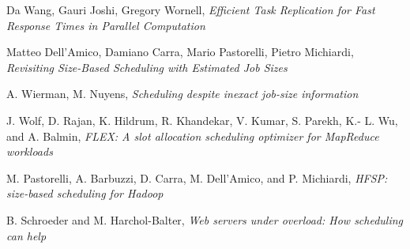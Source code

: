 \documentclass[10pt, conference, compsocconf]{IEEEtran}
\begin{document}

%
%
%
   \begin{thebibliography}{1}


Da Wang, Gauri Joshi, Gregory Wornell, \emph{ Efficient Task Replication for Fast Response Times in Parallel Computation}



Matteo Dell’Amico, Damiano Carra, Mario Pastorelli, Pietro Michiardi, \emph{ Revisiting Size-Based Scheduling
with Estimated Job Sizes}

A. Wierman, M. Nuyens, \emph{ Scheduling despite inexact job-size
information}

J. Wolf, D. Rajan, K. Hildrum, R. Khandekar, V. Kumar, S. Parekh, K.-
L. Wu, and A. Balmin, \emph{FLEX: A slot allocation scheduling optimizer
for MapReduce workloads}

M. Pastorelli, A. Barbuzzi, D. Carra, M. Dell’Amico, and P. Michiardi, \emph{HFSP: size-based scheduling for Hadoop}

B. Schroeder and M. Harchol-Balter, \emph{Web servers under overload: How
scheduling can help}

\end{thebibliography}

\end{document}
